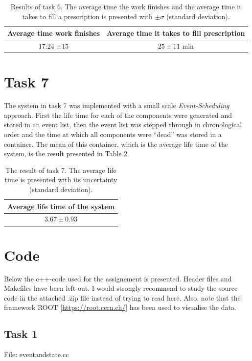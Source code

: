 \documentclass[]{article}
\begin{document}
\begin{table}[H]
  \centering
  \caption{Results of task 6. The average time the work finishes and the average time it takes to fill a prescription is presented with $\pm \sigma$ (standard deviation).}
  \begin{tabular}{c | c}
    Average time work finishes & Average time it takes to fill prescription \\ \hline
    17:24 $\pm 15$ & $25 \pm 11$ min
  \end{tabular}
  \label{tab:task6}
\end{table}

\section{Task 7}
The system in task 7 was implemented with a small scale {\it Event-Scheduling} approach.
First the life time for each of the components were generated and stored in an event list, then the event list was stepped through in chronological order and the time at which all components were ``dead'' was stored in a container.
The mean of this container, which is the average life time of the system, is the result presented in Table \ref{tab:task7}.
\begin{table}[H]
  \centering
  \caption{The result of task 7. The average life time is presented with its uncertainty (standard deviation).}
  \begin{tabular}{c}
    Average life time of the system \\ \hline
    $3.67 \pm 0.93$
  \end{tabular}
  \label{tab:task7}
\end{table}



\section*{Code}
Below the c++-code used for the assignement is presented. Header files and Makefiles have been left out. I would strongly recommend to study the source code in the attached .zip file instead of trying to read here.
Also, note that the framework ROOT [\url{https://root.cern.ch/}] has been used to visualise the data.

\subsection{Task 1}
{\large File: eventandstate.cc}

\end{document}
